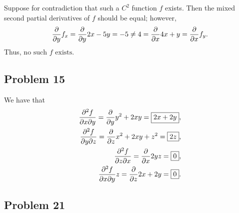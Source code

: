 \documentclass[11pt]{article}
\begin{document}
Suppose for contradiction that such a $C^{2}$ function $f$ exists. Then the mixed second partial derivatives of $f$ should be equal; however,
\[
	\pdv{y} f_{x} = \pdv{y} 2x - 5y = -5 \ne 4 = \pdv{x} 4x + y = \pdv{x} f_{y}.
\]
Thus, $\boxed{\text{no such $f$ exists}}$.


\subsection{Problem 15}

We have that
\begin{align*}
	\pdv[2]{f}{x}{y} = \pdv{y} y^{2} + 2xy = \boxed{2x + 2y}, \\
	\pdv[2]{f}{y}{z} = \pdv{z} x^{2} + 2xy + z^{2} = \boxed{2z}, \\
	\pdv[2]{f}{z}{x} = \pdv{x} 2yz = \boxed{0}, \\
	\pdv[3]{f}{x}{y}{z} = \pdv{z} 2x + 2y = \boxed{0}.
\end{align*}


\subsection{Problem 21}
\end{document}
